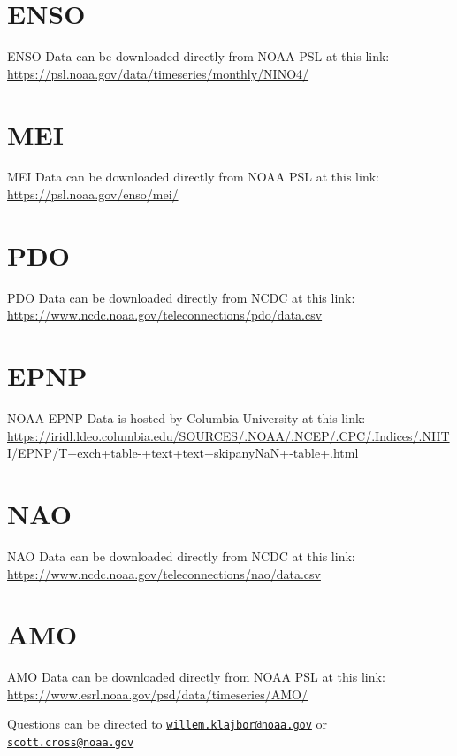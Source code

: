 \documentclass[
]{book}
\begin{document}
\hypertarget{enso}{%
\section{ENSO}\label{enso}}

ENSO Data can be downloaded directly from NOAA PSL at this link: \url{https://psl.noaa.gov/data/timeseries/monthly/NINO4/}

\hypertarget{mei}{%
\section{MEI}\label{mei}}

MEI Data can be downloaded directly from NOAA PSL at this link: \url{https://psl.noaa.gov/enso/mei/}

\hypertarget{pdo}{%
\section{PDO}\label{pdo}}

PDO Data can be downloaded directly from NCDC at this link: \url{https://www.ncdc.noaa.gov/teleconnections/pdo/data.csv}

\hypertarget{epnp}{%
\section{EPNP}\label{epnp}}

NOAA EPNP Data is hosted by Columbia University at this link: \url{https://iridl.ldeo.columbia.edu/SOURCES/.NOAA/.NCEP/.CPC/.Indices/.NHTI/EPNP/T+exch+table-+text+text+skipanyNaN+-table+.html}

\hypertarget{nao}{%
\section{NAO}\label{nao}}

NAO Data can be downloaded directly from NCDC at this link: \url{https://www.ncdc.noaa.gov/teleconnections/nao/data.csv}

\hypertarget{amo}{%
\section{AMO}\label{amo}}

AMO Data can be downloaded directly from NOAA PSL at this link: \url{https://www.esrl.noaa.gov/psd/data/timeseries/AMO/}

Questions can be directed to \href{mailto:willem.klajbor@noaa.gov}{\nolinkurl{willem.klajbor@noaa.gov}} or \href{mailto:scott.cross@noaa.gov}{\nolinkurl{scott.cross@noaa.gov}}
\end{document}
